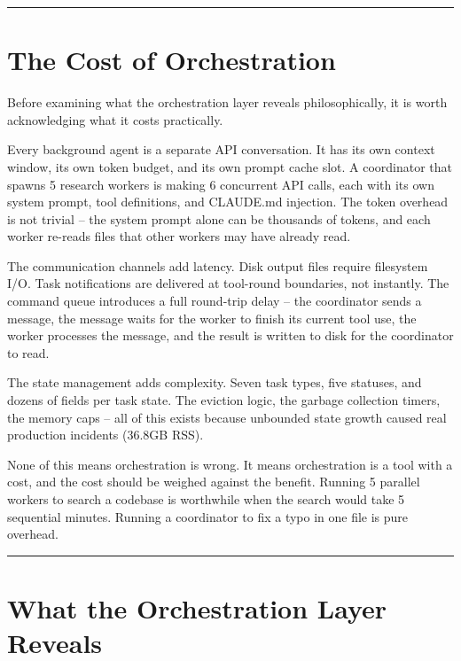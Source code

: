 \documentclass[
  english,
  11pt,
  letterpaper,
]{book}
\begin{document}
\begin{center}\rule{0.5\linewidth}{0.5pt}\end{center}

\section{The Cost of Orchestration}\label{the-cost-of-orchestration}

Before examining what the orchestration layer reveals philosophically,
it is worth acknowledging what it costs practically.

Every background agent is a separate API conversation. It has its own
context window, its own token budget, and its own prompt cache slot. A
coordinator that spawns 5 research workers is making 6 concurrent API
calls, each with its own system prompt, tool definitions, and CLAUDE.md
injection. The token overhead is not trivial -- the system prompt alone
can be thousands of tokens, and each worker re-reads files that other
workers may have already read.

The communication channels add latency. Disk output files require
filesystem I/O. Task notifications are delivered at tool-round
boundaries, not instantly. The command queue introduces a full
round-trip delay -- the coordinator sends a message, the message waits
for the worker to finish its current tool use, the worker processes the
message, and the result is written to disk for the coordinator to read.

The state management adds complexity. Seven task types, five statuses,
and dozens of fields per task state. The eviction logic, the garbage
collection timers, the memory caps -- all of this exists because
unbounded state growth caused real production incidents (36.8GB RSS).

None of this means orchestration is wrong. It means orchestration is a
tool with a cost, and the cost should be weighed against the benefit.
Running 5 parallel workers to search a codebase is worthwhile when the
search would take 5 sequential minutes. Running a coordinator to fix a
typo in one file is pure overhead.

\begin{center}\rule{0.5\linewidth}{0.5pt}\end{center}

\section{What the Orchestration Layer
Reveals}\label{what-the-orchestration-layer-reveals}
\end{document}
